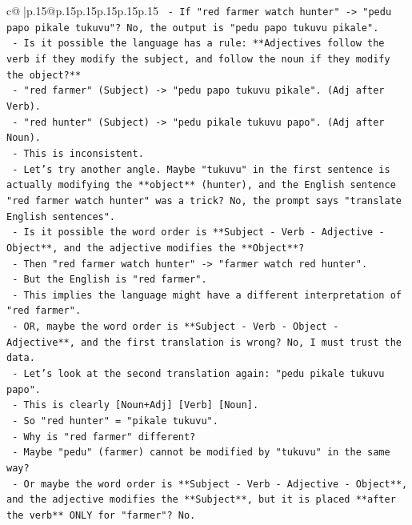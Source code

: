\documentclass{article}
\begin{document}
{\begin{supertabular}{c@{$\;$}|p{.15\linewidth}@{}p{.15\linewidth}p{.15\linewidth}p{.15\linewidth}p{.15\linewidth}p{.15\linewidth}}
{{{\texttt{       {-} If "red farmer watch hunter" {-}> "pedu papo pikale tukuvu"? No, the output is "pedu papo tukuvu pikale".} \\
\texttt{       {-} Is it possible the language has a rule: **Adjectives follow the verb if they modify the subject, and follow the noun if they modify the object?**} \\
\texttt{         {-} "red farmer" (Subject) {-}> "pedu papo tukuvu pikale". (Adj after Verb).} \\
\texttt{         {-} "red hunter" (Subject) {-}> "pedu pikale tukuvu papo". (Adj after Noun).} \\
\texttt{         {-} This is inconsistent.} \\
\texttt{       {-} Let's try another angle. Maybe "tukuvu" in the first sentence is actually modifying the **object** (hunter), and the English sentence "red farmer watch hunter" was a trick? No, the prompt says "translate English sentences".} \\
\texttt{       {-} Is it possible the word order is **Subject {-} Verb {-} Adjective {-} Object**, and the adjective modifies the **Object**?} \\
\texttt{         {-} Then "red farmer watch hunter" {-}> "farmer watch red hunter".} \\
\texttt{         {-} But the English is "red farmer".} \\
\texttt{         {-} This implies the language might have a different interpretation of "red farmer".} \\
\texttt{         {-} OR, maybe the word order is **Subject {-} Verb {-} Object {-} Adjective**, and the first translation is wrong? No, I must trust the data.} \\
\texttt{       {-} Let's look at the second translation again: "pedu pikale tukuvu papo".} \\
\texttt{       {-} This is clearly {[}Noun+Adj{]} {[}Verb{]} {[}Noun{]}.} \\
\texttt{       {-} So "red hunter" = "pikale tukuvu".} \\
\texttt{       {-} Why is "red farmer" different?} \\
\texttt{       {-} Maybe "pedu" (farmer) cannot be modified by "tukuvu" in the same way?} \\
\texttt{       {-} Or maybe the word order is **Subject {-} Verb {-} Adjective {-} Object**, and the adjective modifies the **Subject**, but it is placed **after the verb** ONLY for "farmer"? No.} \\
}}}
\end{supertabular}}
\end{document}

